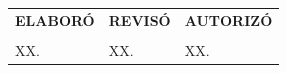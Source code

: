 \documentclass[10pt]{article}
\begin{document}
  \begin{tabular}{p{}p{}p{}}

      \centering
      \textbf{ELABORÓ} 
      &
      \centering
      \textbf{REVISÓ} 
      &
      \centering
      \textbf{AUTORIZÓ}\\
      &&&\\

      \centering
      \hline 
      XX.
      &
      \centering
      \hline 
      XX.
      &
      \centering
      \hline 
       XX.
  \end{tabular}
\end{document}
